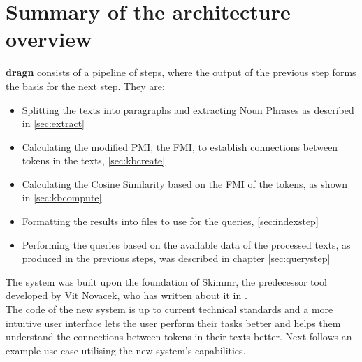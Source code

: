 \section{Summary of the architecture overview}
\textbf{dragn} consists of a pipeline of steps, where the output of the previous step forms the basis for the next step. They are:
\begin{itemize}
\item Splitting the texts into paragraphs and extracting Noun Phrases as described in \ref{sec:extract}
\item Calculating the modified PMI, the FMI, to establish connections between tokens in the texts, \ref{sec:kbcreate}
\item Calculating the Cosine Similarity based on the FMI of the tokens, as shown in \ref{sec:kbcompute}
\item Formatting the results into files to use for the queries, \ref{sec:indexstep}
\item Performing the queries based on the available data of the processed texts, as produced in the previous steps, was described in chapter \ref{sec:querystep}
\end{itemize}
The system was built upon the foundation of Skimmr, the predecessor tool developed by Vit Novacek, who has written about it in \cite{novavcek2014skimmr}.\\
The code of the new system is up to current technical standards and a more intuitive user interface lets the user perform their tasks better and helps them understand the connections between tokens in their texts better.
Next follows an example use case utilising the new system's capabilities.